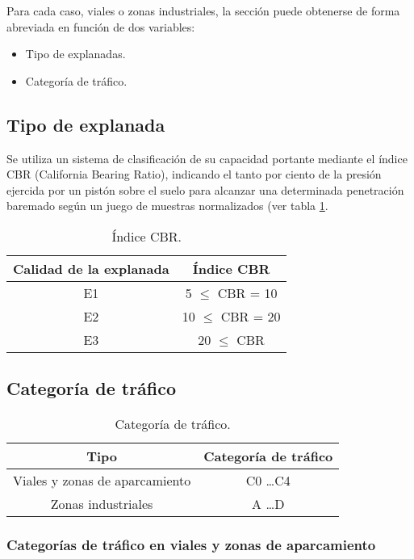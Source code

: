 Para cada caso, viales o zonas industriales, la sección puede obtenerse de forma abreviada en función de dos variables:
\begin{itemize}
\item Tipo de explanadas.
\item Categoría de tráfico.
\end{itemize}

\subsection{Tipo de explanada}

Se utiliza un sistema de clasificación de su capacidad portante mediante el índice CBR (California Bearing Ratio), indicando el tanto por ciento de la presión ejercida por un pistón sobre el suelo para alcanzar una determinada penetración baremado según un juego de muestras normalizados (ver tabla \ref{indicecbr}.

\begin{table}[!htb]
\centering
\begin{tabular}{|c|c|}
\hline
Calidad de la explanada & Índice CBR\\ \hline
E1 & 5 $\leq$ CBR = 10\\ \hline
E2 & 10 $\leq$ CBR = 20\\ \hline
E3 & 20 $\leq$ CBR\\ \hline
\end{tabular}
\caption{Índice CBR.}
\label{indicecbr}
\end{table}


\subsection{Categoría de tráfico}

\begin{table}[!htb]
\centering
\begin{tabular}{|c|c|}
\hline
Tipo & Categoría de tráfico\\ \hline
Viales y zonas de aparcamiento & C0 \ldots C4\\ \hline
Zonas industriales & A \ldots D\\ \hline
\end{tabular}
\caption{Categoría de tráfico.}
\label{categoriadetrafico}
\end{table}

\subsubsection{Categorías de tráfico en viales y zonas de aparcamiento}

